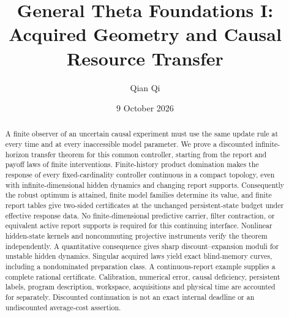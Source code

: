 \documentclass[11pt]{amsart}
\title{General Theta Foundations I: Acquired Geometry and Causal Resource Transfer}
\author{Qian Qi}\date{9 October 2026}
\theoremstyle{definition}\newtheorem{definition}[theorem]{Definition}
\theoremstyle{remark}\newtheorem{remark}[theorem]{Remark}
\begin{document}
\begin{abstract}
A finite observer of an uncertain causal experiment must use the same update rule at every time and at every inaccessible model parameter. We prove a discounted infinite-horizon transfer theorem for this common controller, starting from the report and payoff laws of finite interventions. Finite-history product domination makes the response of every fixed-cardinality controller continuous in a compact topology, even with infinite-dimensional hidden dynamics and changing report supports. Consequently the robust optimum is attained, finite model families determine its value, and finite report tables give two-sided certificates at the unchanged persistent-state budget under effective response data. No finite-dimensional predictive carrier, filter contraction, or equivalent active report supports is required for this continuing interface. Nonlinear hidden-state kernels and noncommuting projective instruments verify the theorem independently. A quantitative consequence gives sharp discount--expansion moduli for unstable hidden dynamics. Singular acquired laws yield exact blind-memory curves, including a nondominated preparation class. A continuous-report example supplies a complete rational certificate. Calibration, numerical error, causal deficiency, persistent labels, program description, workspace, acquisitions and physical time are accounted for separately. Discounted continuation is not an exact internal deadline or an undiscounted average-cost assertion.
\end{abstract}
\maketitle









\end{document}
